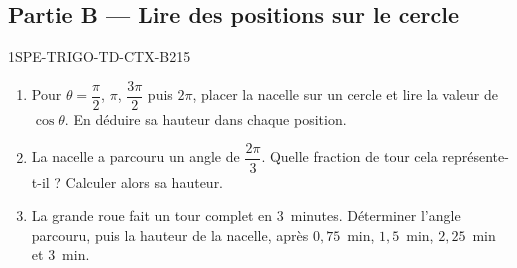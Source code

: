 
\subsection*{Partie B — Lire des positions sur le cercle}

\begin{exercice}{1SPE-TRIGO-TD-CTX-B}{2}{15}
\begin{enumerate}
  \item Pour $\theta=\dfrac{\pi}{2}$, $\pi$, $\dfrac{3\pi}{2}$ puis $2\pi$,
    placer la nacelle sur un cercle et lire la valeur de $\cos\theta$. En déduire
    sa hauteur dans chaque position.
  \item La nacelle a parcouru un angle de $\dfrac{2\pi}{3}$. Quelle fraction de
    tour cela représente-t-il ? Calculer alors sa hauteur.
  \item La grande roue fait un tour complet en $3$~minutes. Déterminer l'angle
    parcouru, puis la hauteur de la nacelle, après $0{,}75$~min, $1{,}5$~min,
    $2{,}25$~min et $3$~min.
\end{enumerate}
\end{exercice}

